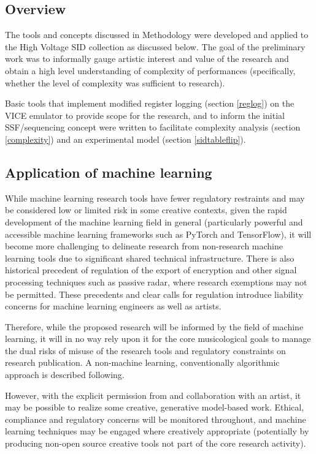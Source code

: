 \documentclass[10pt]{article}
\begin{document}
\begin{multicols*}{2}
\subsection{Overview}
\label{prelimover}

The tools and concepts discussed in Methodology were developed and applied to the High Voltage SID collection as discussed below. The goal of the preliminary work was to informally gauge artistic interest and value of the research and obtain a high level understanding of complexity of performances (specifically, whether the level of complexity was sufficient to research).

Basic tools that implement modified register logging (section \ref{reglog}) on the VICE emulator\cite{asidvice} to provide scope for the research, and to inform the initial SSF/sequencing concept were written to facilitate complexity analysis (section \ref{complexity}) and an experimental model (section \ref{sidtableflip}).

\subsection{Application of machine learning}

While machine learning research tools have fewer regulatory restraints and may be considered low or limited risk in some creative contexts, given the rapid development of the machine learning field in general (particularly powerful and accessible machine learning frameworks such as PyTorch and TensorFlow), it will become more challenging to delineate research from non-research machine learning tools due to significant shared technical infrastructure. There is also historical precedent of regulation of the export of encryption and other signal processing techniques such as passive radar\cite{munitions}, where research exemptions may not be permitted. These precedents and clear calls for regulation introduce liability concerns for machine learning engineers as well as artists.

Therefore, while the proposed research will be informed by the field of machine learning, it will in no way rely upon it for the core musicological goals to manage the dual risks of misuse of the research tools and regulatory constraints on research publication. A non-machine learning, conventionally algorithmic approach is described following.

However, with the explicit permission from and collaboration with an artist, it may be possible to realize some creative, generative model-based work. Ethical, compliance and regulatory concerns will be monitored throughout, and machine learning techniques may be engaged where creatively appropriate (potentially by producing non-open source creative tools not part of the core research activity).


\end{multicols*}
\end{document}
